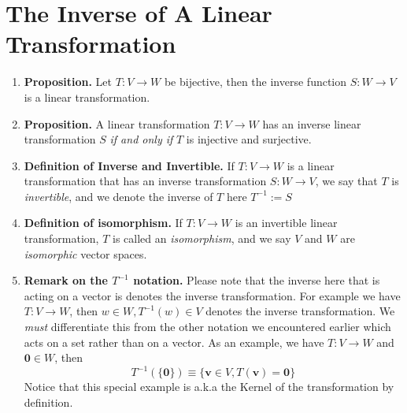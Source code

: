 \documentclass[oneside, 12pt]{book}
\newcommand{\settag}[1]{\renewcommand{\theenumi}{#1}}
\newcommand{\tbf}[1]{\textbf{#1}}
\newcommand{\tit}[1]{\textit{#1}}
\newcommand{\trans}[3]{$#1:#2\rightarrow{}#3$}
\newcommand{\para}[1]{\item \tbf{#1}}
\newcommand{\vv}{\mathbf{v}}
\newcommand{\vzero}{\mathbf{0}}
\begin{document}
\section{The Inverse of A Linear Transformation}
\begin{enumerate}
    \settag{2.6.1}
    \para{Proposition.} Let \trans{T}{V}{W} be bijective, then the inverse function \trans{S}{W}{V} is a linear transformation.
    
    \settag{2.6.2}
    \para{Proposition.} A linear transformation \trans{T}{V}{W} has an inverse linear transformation $S$ \tit{if and only if} $T$ is injective and surjective.
    
    \settag{2.6.3}
    \para{Definition of Inverse and Invertible.} If \trans{T}{V}{W} is a linear transformation that has an inverse transformation \trans{S}{W}{V}, we say that $T$ is \tit{invertible}, and we denote the inverse of $T$ here $T^{-1} := S$ 
    
    \settag{2.6.4}
    \para{Definition of isomorphism.} If \trans{T}{V}{W} is an invertible linear transformation, $T$ is called an \tit{isomorphism}, and we say $V$ and $W$ are \tit{isomorphic} vector spaces.
    
    \settag{2.6.5}
    \para{Remark on the $T^{-1}$ notation.} Please note that the inverse here that is acting on a vector is denotes the inverse transformation. For example we have \trans{T}{V}{W}, then $w\in W, T^{-1}(w)\in V$ denotes the inverse transformation. We \textit{must} differentiate this from the other notation we encountered earlier which acts on a set rather than on a vector. As an example, we have \trans{T}{V}{W} and $\vzero\in W$, then
    \begin{equation*}
        T^{-1}\left(\{\vzero\}\right) \equiv \{\vv\in V, T(\vv) = \vzero\}
    \end{equation*}
    Notice that this special example is a.k.a the Kernel of the transformation by definition.
    

\end{enumerate}
\end{document}

